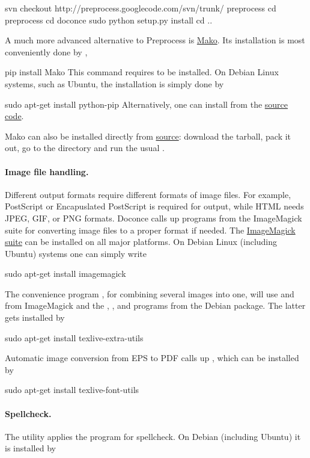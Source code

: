 \documentclass[%
oneside,                 %
final,                   %
10pt]{article}
\begin{document}
\bsys
svn checkout http://preprocess.googlecode.com/svn/trunk/ preprocess
cd preprocess
cd doconce
sudo python setup.py install
cd ..
\esys

A much more advanced alternative to Preprocess is
\href{{http://www.makotemplates.org}}{Mako}. Its installation is most
conveniently done by ,

\bsys
pip install Mako
\esys
This command requires  to be installed. On Debian Linux systems,
such as Ubuntu, the installation is simply done by

\bsys
sudo apt-get install python-pip
\esys
Alternatively, one can install from the  \href{{http://pypi.python.org/pypi/pip}}{source code}.

Mako can also be installed directly from
\href{{http://www.makotemplates.org/download.html}}{source}: download the
tarball, pack it out, go to the directory and run
the usual .

\paragraph{Image file handling.}
Different output formats require different formats of image files.
For example, PostScript or Encapuslated PostScript is required for 
output, while HTML needs JPEG, GIF, or PNG formats.
Doconce calls up programs from the ImageMagick suite for converting
image files to a proper format if needed. The \href{{http://www.imagemagick.org/script/index.php}}{ImageMagick suite} can be installed on all major platforms.
On Debian Linux (including Ubuntu) systems one can simply write

\bsys
sudo apt-get install imagemagick
\esys

The convenience program , for combining several
images into one, will use  and  from ImageMagick and
the , , and  programs from the 
Debian package. The latter gets installed by

\bsys
sudo apt-get install texlive-extra-utils
\esys

Automatic image conversion from EPS to PDF calls up , which
can be installed by

\bsys
sudo apt-get install texlive-font-utils
\esys

\paragraph{Spellcheck.}
The utility  applies the  program for
spellcheck. On Debian (including Ubuntu) it is installed by
\end{document}
